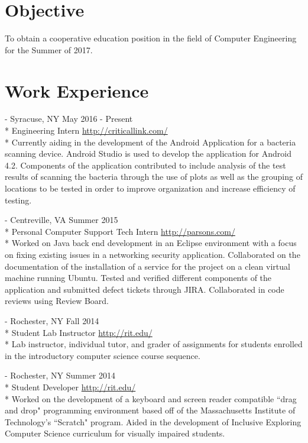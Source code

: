 \documentclass[a4paper,margin,line]{resume}
\newcommand{\rurl}[1]{\hfill {\footnotesize \url{#1}}}
\newcommand{\rdate}[1]{\hfill {\small #1}}
\renewcommand{\employer}[5]{ \item[#1] - #2 \rdate{#3} \\* #4 \rurl{#5} \\*}
\begin{document}
\begin{resume}
\section{\mysidestyle Objective}
    To obtain a cooperative education position in the field of Computer Engineering for the Summer of 2017.
\section{\mysidestyle Work Experience}
	\begin{asparadesc}
        \employer{Critical Link LLC}{Syracuse, NY}{May 2016 - Present}{Engineering Intern}
        {http://criticallink.com/}
        \small
        Currently aiding in the development of the Android Application for a bacteria scanning device. 
        Android Studio is used to develop the application for Android 4.2.  Components of the application 
        contributed to include analysis of the test results of scanning the bacteria through the use 
        of plots as well as the grouping of locations to be tested in order to improve organization 
        and increase efficiency of testing.
        \normalsize
        \\
        \employer{Parsons Government Services}{Centreville, VA}{Summer 2015}{Personal Computer Support Tech Intern}
        {http://parsons.com/}
        \small
        Worked on Java back end development in an Eclipse environment with a focus on fixing existing 
        issues in a networking security application. Collaborated on the documentation of the installation 
        of a service for the project on a clean virtual machine running Ubuntu. Tested and verified 
        different components of the application and submitted defect tickets through JIRA.  Collaborated 
        in code reviews using Review Board.
        \normalsize
        \\
        \employer{Rochester Institute of Technology}{Rochester, NY}{Fall 2014}{Student Lab Instructor}
        {http://rit.edu/}
        \small
        Lab instructor, individual tutor, and grader of assignments for students enrolled in the 
        introductory computer science course sequence.
        \normalsize
        \\
        \employer{Rochester Institute of Technology}{Rochester, NY}{Summer 2014}{Student Developer}
        {http://rit.edu/}
        \small
        Worked on the development of a keyboard and screen reader compatible ``drag and drop" programming 
        environment based off of the Massachusetts Institute of Technology's ``Scratch" program.  Aided 
        in the development of Inclusive Exploring Computer Science curriculum for visually impaired students.
        \normalsize
        \\
    \end{asparadesc}


\end{resume}
\end{document}
